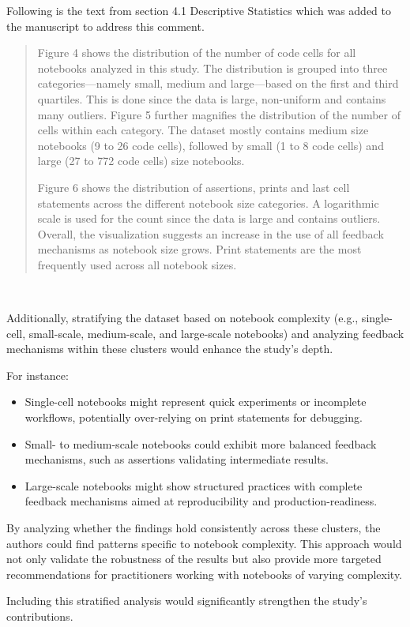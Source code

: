 \documentclass[11pt,fleqn]{article}
\newcommand{\eline}{\vspace*{.75\baselineskip}}
\newcommand{\Referee}[1]{\eline \noindent {\bf Reviewer comment #1:} \\}
\newenvironment{revcomment}[1][]
{\Referee{#1}\begin{rcomment}}
{\end{rcomment}}
\begin{document}
Following is the text from section 4.1 Descriptive Statistics which was added to the manuscript to address this comment.

\begin{quote}
  Figure 4 shows the distribution of the number of code cells for all notebooks analyzed in this study. The distribution is grouped into three categories---namely small, medium and large---based on the first and third quartiles. This is done since the data is large, non-uniform and contains many outliers. Figure 5 further magnifies the distribution of the number of cells within each category. The dataset mostly contains medium size notebooks (9 to 26 code cells), followed by small (1 to 8 code cells) and large (27 to 772 code cells) size notebooks.

  Figure 6 shows the distribution of assertions, prints and last cell statements across the different notebook size categories. A logarithmic scale is used for the count since the data is large and contains outliers. Overall, the visualization suggests an increase in the use of all feedback mechanisms as notebook size grows. Print statements are the most frequently used across all notebook sizes.
\end{quote}

\begin{revcomment}[2.4]
  Additionally, stratifying the dataset based on notebook complexity (e.g., single-cell, small-scale, medium-scale, and large-scale notebooks) and analyzing feedback mechanisms within these clusters would enhance the study's depth.

  For instance:
  \begin{itemize}
    \item Single-cell notebooks might represent quick experiments or incomplete workflows, potentially over-relying on print statements for debugging.
    \item Small- to medium-scale notebooks could exhibit more balanced feedback mechanisms, such as assertions validating intermediate results.
    \item Large-scale notebooks might show structured practices with complete feedback mechanisms aimed at reproducibility and production-readiness.
  \end{itemize}

  By analyzing whether the findings hold consistently across these clusters, the authors could find patterns specific to notebook complexity. This approach would not only validate the robustness of the results but also provide more targeted recommendations for practitioners working with notebooks of varying complexity. 
  
  Including this stratified analysis would significantly strengthen the study's contributions.
\end{revcomment}
\end{document}
